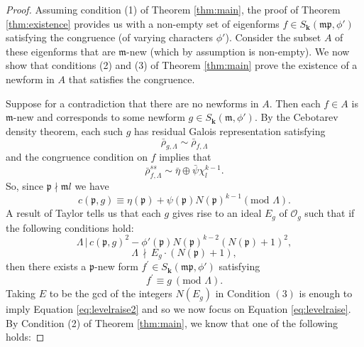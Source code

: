\documentclass[a4paper,oneside]{amsart}
\theoremstyle{plain}
\theoremstyle{definition}
\begin{document}
\begin{proof}
Assuming condition (1) of Theorem \ref{thm:main}, the proof of Theorem \ref{thm:existence} provides us with a non-empty set of eigenforms $f \in S_{\textbf{k}}(\mathfrak{mp}, \phi')$ satisfying the congruence (of varying characters $\phi'$). Consider the subset $A$ of these eigenforms that are $\mathfrak{m}$-new (which by assumption is non-empty). We now show that conditions (2) and (3) of Theorem \ref{thm:main} prove the existence of a newform in $A$ that satisfies the congruence. 

Suppose for a contradiction that there are no newforms in $A$. Then each $f\in A$ is $\mathfrak{m}$-new and corresponds to some newform $g \in S_{\textbf{k}}(\mathfrak{m}, \phi')$. By the Cebotarev density theorem, each such $g$ has residual Galois representation satisfying 
\begin{equation*}
    \bar{\rho}_{g, \Lambda} \sim \bar{\rho}_{f, \Lambda}
\end{equation*}
and the congruence condition on $f$ implies that
\begin{equation*}
    \bar{\rho}_{f, \Lambda}^{ss} \sim \bar{\eta} \oplus \bar{\psi}\chi_l^{k-1}.
\end{equation*}
So, since $\mathfrak{p} \nmid \mathfrak{m}l$ we have 
\begin{equation*}
    c(\mathfrak{p}, g) \equiv \eta(\mathfrak{p}) + \psi(\mathfrak{p})N(\mathfrak{p})^{k-1} (\text{mod } \Lambda).
\end{equation*}
A result of Taylor \cite[Thm. 1]{taylor} tells us that each $g$ gives rise to an ideal $E_g$ of $\mathcal{O}_g$ such that if the following conditions hold:
\begin{equation}
\label{eq:levelraise}
     \Lambda\,|\, c(\mathfrak{p}, g)^2 - \phi'(\mathfrak{p})N(\mathfrak{p})^{k-2}(N(\mathfrak{p})+1)^2, 
\end{equation}
\begin{equation}
\label{eq:levelraise2}
     \Lambda\,\nmid\, E_g\cdot (N(\mathfrak{p})+1),
\end{equation}
then there exists a $\mathfrak{p}$-new form $f^\prime \in S_{\textbf{k}}(\mathfrak{mp}, \phi')$ satisfying 
\begin{equation*}
    f^\prime \equiv g \ (\text{mod } \Lambda).
\end{equation*} Taking $E$ to be the gcd of the integers $N(E_g)$ in Condition $(3)$ is enough to imply Equation \ref{eq:levelraise2} and so we now focus on Equation \ref{eq:levelraise}.
By Condition (2) of Theorem \ref{thm:main}, we know that one of the following holds:

\end{proof}
\end{document}
